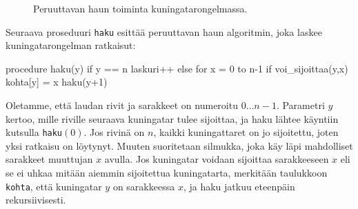 \begin{figure}
\center
{}
\caption{Peruuttavan haun toiminta kuningatarongelmassa.}
\label{fig:hakupuu}
\end{figure}


Seuraava proseduuri \texttt{haku} esittää peruuttavan haun algoritmin,
joka laskee kuningatarongelman ratkaisut:

\begin{code}
procedure haku(y)
    if y == n
        laskuri++
    else
        for x = 0 to n-1
            if voi_sijoittaa(y,x)
                kohta[y] = x
                haku(y+1)
\end{code}

Oletamme, että laudan rivit ja sarakkeet on numeroitu $0 \dots n-1$.
Parametri $y$ kertoo, mille riville seuraava kuningatar tulee sijoittaa,
ja haku lähtee käyntiin kutsulla \texttt{haku}$(0)$.
Jos rivinä on $n$, kaikki kuningattaret on jo sijoitettu,
joten yksi ratkaisu on löytynyt.
Muuten suoritetaan silmukka, joka käy läpi mahdolliset sarakkeet
muuttujan $x$ avulla.
Jos kuningatar voidaan sijoittaa sarakkeeseen $x$
eli se ei uhkaa mitään aiemmin sijoitettua kuningatarta,
merkitään taulukkoon \texttt{kohta},
että kuningatar $y$ on sarakkeessa $x$,
ja haku jatkuu eteenpäin rekursiivisesti.

